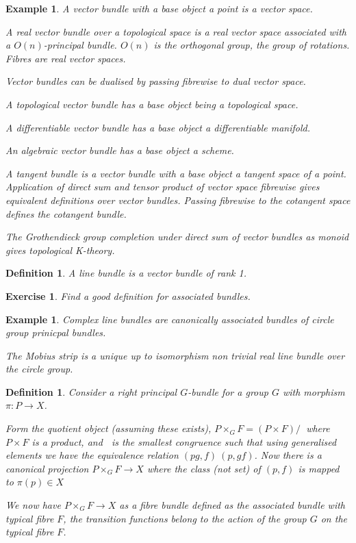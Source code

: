 \documentclass{tufte-book}
\newtheorem{definition}[theorem]{Definition}
\newtheorem{example}[theorem]{Example}
\newtheorem{exercise}[theorem]{Exercise}
\begin{document}
\begin{example}
	A vector bundle with a base object a point is a vector space.

	A real vector bundle over a topological space is a real vector space associated with a $O(n)$-principal bundle. $O(n)$ is the orthogonal group, the group of rotations. Fibres are real vector spaces.

	Vector bundles can be dualised by passing fibrewise to dual vector space.

	A topological vector bundle has a base object being a topological space.

	A differentiable vector bundle has a base object a differentiable manifold.

	An algebraic vector bundle has a base object a scheme.

	A tangent bundle is a vector bundle with a base object a tangent space of a point.
	Application of direct sum and tensor product of vector space fibrewise gives equivalent definitions over vector bundles. Passing fibrewise to the cotangent space defines the cotangent bundle.
	
	The Grothendieck group completion under direct sum of vector bundles as monoid gives topological K-theory.
\end{example}

\begin{definition}
	A line bundle is a vector bundle of rank 1.
\end{definition}

\begin{exercise}
	Find a good definition for associated bundles.
\end{exercise}

\begin{example}
	Complex line bundles are canonically associated bundles of circle group prinicpal bundles.

	The Mobius strip is a unique up to isomorphism non trivial real line bundle over the circle group.
\end{example}

\begin{definition}
	Consider a right principal $G$-bundle for a group $G$ with morphism $\pi : P \rightarrow X$.

	Form the quotient object (assuming these exists), $P \times_G F = (P \times F) / ~$ where $P \times F$ is a product, and $~$ is the smallest congruence such that using generalised elements we have the equivalence relation $(pg, f) ~ (p, gf)$. Now there is a canonical projection $P \times_G F \rightarrow X$ where the class (not set) of $(p, f)$ is mapped to $\pi(p) \in X$

	We now have $P \times_G F \rightarrow X$ as a fibre bundle defined as the associated bundle with typical fibre $F$, the transition functions belong to the action of the group $G$ on the typical fibre $F$.
\end{definition}
\end{document}
